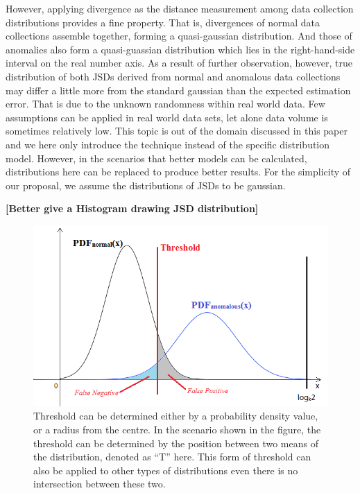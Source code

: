 \documentclass[a4paper]{IEEEtran}
\begin{document}
			However, applying divergence as the distance measurement among data collection distributions provides a fine property. That is, divergences of normal data collections assemble together, forming a quasi-gaussian distribution. And those of anomalies also form a quasi-guassian distribution which lies in the right-hand-side interval on the real number axis. As a result of further observation, however, true distribution of both JSDs derived from normal and anomalous data collections may differ a little more from the standard gaussian than the expected estimation error. That is due to the unknown randomness within real world data. Few assumptions can be applied in real world data sets, let alone data volume is sometimes relatively low. This topic is out of the domain discussed in this paper and we here only introduce the technique instead of the specific distribution model. However, in the scenarios that better models can be calculated, distributions here can be replaced to produce better results. For the simplicity of our proposal, we assume the distributions of JSDs to be gaussian.
			
			\textbf{[Better give a Histogram drawing JSD distribution]}
			
			\begin{figure}[!t]
				\centering
				\includegraphics[width=\linewidth]{fig/ExampleThreshold.png}
				\caption{Threshold can be determined either by a probability density value, or a radius from the centre. In the scenario shown in the figure, the threshold can be determined by the position between two means of the distribution, denoted as ``T'' here. This form of threshold can also be applied to other types of distributions even there is no intersection between these two.}
				\label{fig:example-threshold}
			\end{figure}
			
\end{document}
